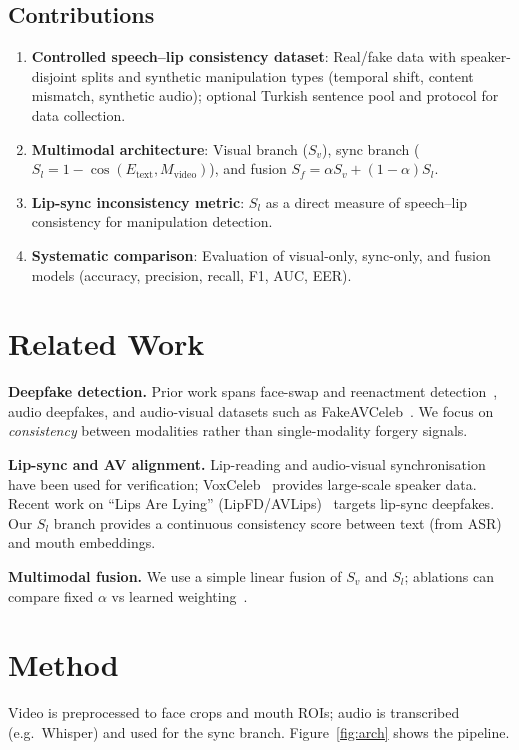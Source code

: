 \documentclass{article}
\begin{document}
\subsection{Contributions}
\begin{enumerate}
  \item \textbf{Controlled speech--lip consistency dataset}: Real/fake data with speaker-disjoint splits and synthetic manipulation types (temporal shift, content mismatch, synthetic audio); optional Turkish sentence pool and protocol for data collection.
  \item \textbf{Multimodal architecture}: Visual branch ($S_v$), sync branch ($S_l = 1 - \cos(E_{\text{text}}, M_{\text{video}})$), and fusion $S_f = \alpha S_v + (1-\alpha) S_l$.
  \item \textbf{Lip-sync inconsistency metric}: $S_l$ as a direct measure of speech--lip consistency for manipulation detection.
  \item \textbf{Systematic comparison}: Evaluation of visual-only, sync-only, and fusion models (accuracy, precision, recall, F1, AUC, EER).
\end{enumerate}

\section{Related Work}
\textbf{Deepfake detection.} Prior work spans face-swap and reenactment detection~\cite{rossler2019faceforensics,li2020celebdfface}, audio deepfakes, and audio-visual datasets such as FakeAVCeleb~\cite{haldar2024fakeavceleb}. We focus on \emph{consistency} between modalities rather than single-modality forgery signals.

\textbf{Lip-sync and AV alignment.} Lip-reading and audio-visual synchronisation have been used for verification; VoxCeleb~\cite{chung2017voxceleb} provides large-scale speaker data. Recent work on ``Lips Are Lying'' (LipFD/AVLips)~\cite{tian2024lips} targets lip-sync deepfakes. Our $S_l$ branch provides a continuous consistency score between text (from ASR) and mouth embeddings.

\textbf{Multimodal fusion.} We use a simple linear fusion of $S_v$ and $S_l$; ablations can compare fixed $\alpha$ vs learned weighting~\cite{tolosana2020deepfakes}.

\section{Method}
Video is preprocessed to face crops and mouth ROIs; audio is transcribed (e.g.\ Whisper) and used for the sync branch. Figure~\ref{fig:arch} shows the pipeline.
\end{document}
